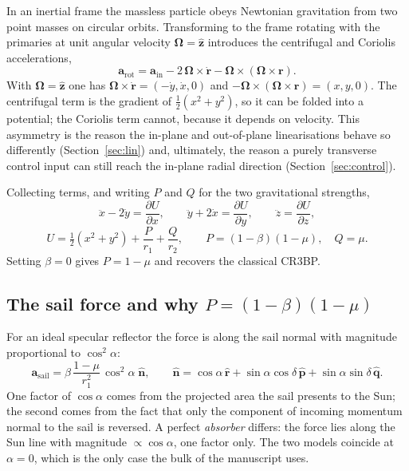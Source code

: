 \documentclass[11pt,a4paper]{article}
\newcommand{\rhat}{\hat{\bm{r}}}
\newcommand{\phat}{\hat{\bm{p}}}
\newcommand{\qhat}{\hat{\bm{q}}}
\newcommand{\nhat}{\hat{\bm{n}}}
\begin{document}
In an inertial frame the massless particle obeys Newtonian gravitation from two
point masses on circular orbits. Transforming to the frame rotating with the
primaries at unit angular velocity $\bm{\Omega}=\hat{\bm{z}}$ introduces the
centrifugal and Coriolis accelerations,
\begin{equation}
  \bm{a}_{\mathrm{rot}} = \bm{a}_{\mathrm{in}}
  - 2\,\bm{\Omega}\times\dot{\bm{r}}
  - \bm{\Omega}\times(\bm{\Omega}\times\bm{r}) .
\end{equation}
With $\bm{\Omega}=\hat{\bm{z}}$ one has
$\bm{\Omega}\times\dot{\bm{r}}=(-\dot y,\dot x,0)$ and
$-\bm{\Omega}\times(\bm{\Omega}\times\bm{r})=(x,y,0)$. The centrifugal term is
the gradient of $\tfrac12(x^2+y^2)$, so it can be folded into a potential; the
Coriolis term cannot, because it depends on velocity. This asymmetry is the
reason the in-plane and out-of-plane linearisations behave so differently
(Section~\ref{sec:lin}) and, ultimately, the reason a purely transverse control
input can still reach the in-plane radial direction (Section~\ref{sec:control}).

Collecting terms, and writing $P$ and $Q$ for the two gravitational strengths,
\begin{equation}
  \ddot x - 2\dot y = \frac{\partial U}{\partial x}, \qquad
  \ddot y + 2\dot x = \frac{\partial U}{\partial y}, \qquad
  \ddot z         = \frac{\partial U}{\partial z},
  \label{eq:eom}
\end{equation}
\begin{equation}
  U = \tfrac12(x^2+y^2) + \frac{P}{r_1} + \frac{Q}{r_2},
  \qquad P=(1-\beta)(1-\mu), \quad Q=\mu .
  \label{eq:U}
\end{equation}
Setting $\beta=0$ gives $P=1-\mu$ and recovers the classical CR3BP.

\subsection{The sail force and why \texorpdfstring{$P=(1-\beta)(1-\mu)$}{P=(1-beta)(1-mu)}}

For an ideal specular reflector the force is along the sail normal with
magnitude proportional to $\cos^2\alpha$:
\begin{equation}
  \bm{a}_{\mathrm{sail}} = \beta\,\frac{1-\mu}{r_1^2}\,\cos^2\alpha\;\nhat ,
  \qquad
  \nhat = \cos\alpha\,\rhat + \sin\alpha\cos\delta\,\phat
        + \sin\alpha\sin\delta\,\qhat .
  \label{eq:sail}
\end{equation}
One factor of $\cos\alpha$ comes from the projected area the sail presents to
the Sun; the second comes from the fact that only the component of incoming
momentum normal to the sail is reversed. A perfect \emph{absorber} differs: the
force lies along the Sun line with magnitude $\propto\cos\alpha$, one factor
only. The two models coincide at $\alpha=0$, which is the only case the bulk of
the manuscript uses.
\end{document}
